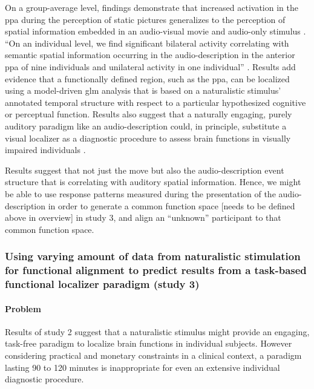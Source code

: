 On a group-average level, findings demonstrate that increased activation in the
\ac{ppa} during the perception of static pictures generalizes to the perception
of spatial information embedded in an audio-visual movie and audio-only stimulus
\citep{haeusler2022processing}.
``On an individual level, we find significant bilateral activity correlating
with semantic spatial information occurring in the audio-description in the
anterior \ac{ppa} of nine individuals and unilateral activity in one
individual'' \citep{haeusler2022processing}.
Results add evidence that a functionally defined region, such as the \ac{ppa},
can be localized using a model-driven \ac{glm} analysis that is based on a
naturalistic stimulus' annotated temporal structure with respect to a particular
hypothesized cognitive or perceptual function.
Results also suggest that a naturally engaging, purely auditory paradigm like an
audio-description could, in principle, substitute a visual localizer as a
diagnostic procedure to assess brain functions in visually
impaired individuals \citep{haeusler2022processing}.


Results suggest that not just the move but also the audio-description event
structure that is correlating with auditory spatial information.
Hence, we might be able to use response patterns measured during the
presentation of the audio-description in order to generate a common function
space [needs to be defined above in overview] in study 3, and align an
``unknown'' participant to that common function space.


\subsubsection{Using varying amount of data from naturalistic stimulation for
functional alignment to predict results from a task-based functional localizer
paradigm (study 3)}





\paragraph{Problem}
Results of study 2 suggest that a naturalistic stimulus might provide an
engaging, task-free paradigm to localize brain functions in individual subjects.
%
However considering practical and monetary constraints in a clinical context, a
paradigm lasting 90 to 120 minutes is inappropriate for even an extensive
individual diagnostic procedure.


